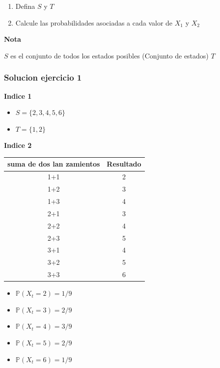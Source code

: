 \documentclass{article}
\begin{document}
\begin{enumerate}
    \item Defina \(S\) y \(T\)
    \item Calcule las probabilidades asociadas a cada valor de \(X_1\) y \(X_2\)
\end{enumerate}

\textbf{Nota}

$S$ es el conjunto de todos los estados posibles (Conjunto de estados)
$T$

\subsubsection*{Solucion ejercicio 1}

\textbf{Indice 1}
\begin{itemize}
    \item \(S = \{2,3,4,5,6\}\)
    \item \(T = \{1,2\}\)
\end{itemize}

\textbf{Indice 2}

\begin{tabular}{c|c}
    suma de dos lan zamientos & Resultado \\
    \hline
    1+1                       & 2         \\
    1+2                       & 3         \\
    1+3                       & 4         \\
    2+1                       & 3         \\
    2+2                       & 4         \\
    2+3                       & 5         \\
    3+1                       & 4         \\
    3+2                       & 5         \\
    3+3                       & 6         \\
\end{tabular}

\begin{itemize}
    \item $\mathbb{P}(X_t = 2) = 1/9$
    \item $\mathbb{P}(X_t = 3) = 2/9$
    \item $\mathbb{P}(X_t = 4) = 3/9$
    \item $\mathbb{P}(X_t = 5) = 2/9$
    \item $\mathbb{P}(X_t = 6) = 1/9$
\end{itemize}
\end{document}
